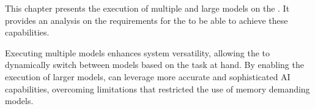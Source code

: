This chapter presents the execution of multiple and large models on the \graicore{}.
It provides an analysis on the requirements for the \confignoc{} to be able to achieve these capabilities.

Executing multiple models enhances system versatility, allowing the \graicore{} to dynamically switch between models based on the task at hand.
By enabling the execution of larger models, \graicore{} can leverage more accurate and sophisticated AI capabilities, overcoming limitations that restricted the use of memory demanding models.
